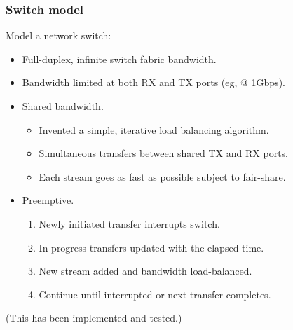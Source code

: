 \documentclass[xcolor=dvipsnames]{beamer}
\begin{document}
\begin{frame}
  \frametitle{Switch model}
  Model a network switch:

  \begin{itemize}
  \item Full-duplex, infinite switch fabric bandwidth.
  \item Bandwidth limited at both RX and TX ports  (eg, @ 1Gbps).
  \item Shared bandwidth.
    \begin{itemize}
    \item Invented a simple, iterative load balancing algorithm.
    \item Simultaneous transfers between shared TX and RX ports.
    \item Each stream goes as fast as possible subject to fair-share.
    \end{itemize}
  \item Preemptive.
    \begin{enumerate}
    \item Newly initiated transfer interrupts switch.
    \item In-progress transfers updated with the elapsed time.
    \item New stream added and bandwidth load-balanced.
    \item Continue until interrupted or next transfer completes.
    \end{enumerate}
  \end{itemize}

  (This has been implemented and tested.)
\end{frame}
\end{document}
